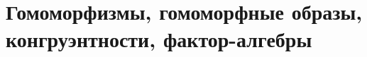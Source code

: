 \documentclass[../main/document.tex]{subfiles}
\begin{document}
\section{Гомоморфизмы, гомоморфные образы,\\ конгруэнтности, фактор-алгебры}
\end{document}

